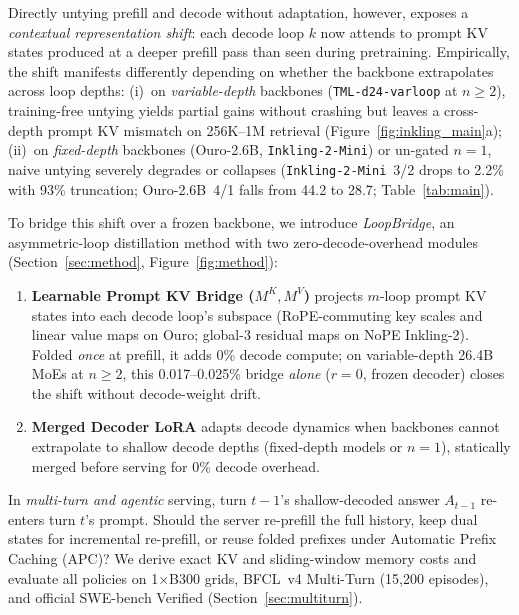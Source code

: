 \documentclass[11pt]{article}
\begin{document}
Directly untying prefill and decode without adaptation, however, exposes a \emph{contextual representation shift}: each
decode loop $k$ now attends to prompt KV states produced at a deeper prefill pass than seen during pretraining.
Empirically, the shift manifests differently depending on whether the backbone extrapolates across loop depths:
(i)~on \emph{variable-depth} backbones (\texttt{TML-d24-varloop} at $n{\ge}2$), training-free untying yields partial
gains without crashing but leaves a cross-depth prompt KV mismatch on 256K--1M retrieval
(Figure~\ref{fig:inkling_main}a);
(ii)~on \emph{fixed-depth} backbones (Ouro-2.6B, \texttt{Inkling-2-Mini}) or un-gated $n{=}1$, naive untying severely
degrades or collapses (\texttt{Inkling-2-Mini}~3/2 drops to 2.2\% with 93\% truncation; Ouro-2.6B~4/1 falls from 44.2 to
28.7; Table~\ref{tab:main}).

To bridge this shift over a frozen backbone, we introduce \emph{LoopBridge}, an asymmetric-loop distillation method with
two zero-decode-overhead modules (Section~\ref{sec:method}, Figure~\ref{fig:method}):
\begin{enumerate}
\item \textbf{Learnable Prompt KV Bridge ($M^K, M^V$)} projects $m$-loop prompt KV states into each decode loop's
subspace (RoPE-commuting key scales and linear value maps on Ouro; global-3 residual maps on NoPE Inkling-2). Folded
\emph{once} at prefill, it adds 0\% decode compute; on variable-depth 26.4B MoEs at $n{\ge}2$, this 0.017--0.025\%
bridge \emph{alone} ($r{=}0$, frozen decoder) closes the shift without decode-weight drift.
\item \textbf{Merged Decoder LoRA} adapts decode dynamics when backbones cannot extrapolate to shallow decode depths
(fixed-depth models or $n{=}1$), statically merged before serving for 0\% decode overhead.
\end{enumerate}

In \emph{multi-turn and agentic} serving, turn $t{-}1$'s shallow-decoded answer $A_{t-1}$ re-enters turn $t$'s prompt.
Should the server re-prefill the full history, keep dual states for incremental re-prefill, or reuse folded prefixes
under Automatic Prefix Caching (APC)? We derive exact KV and sliding-window memory costs and evaluate all policies on
1$\times$B300 grids, BFCL~v4 Multi-Turn (15,200 episodes), and official SWE-bench Verified (Section~\ref{sec:multiturn}).
\end{document}
